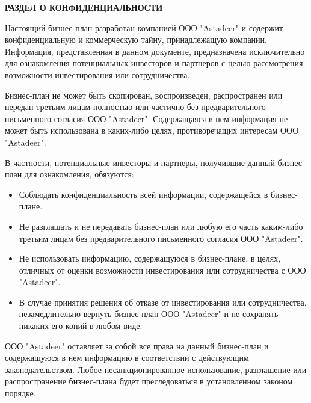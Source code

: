 \newpage %

\begin{center}
    {\Large \textbf{РАЗДЕЛ О КОНФИДЕНЦИАЛЬНОСТИ}}
\end{center}

\vspace{1cm} %

\noindent Настоящий бизнес-план разработан компанией ООО "Astadeer" и содержит конфиденциальную и коммерческую тайну, принадлежащую компании. Информация, представленная в данном документе, предназначена исключительно для ознакомления потенциальных инвесторов и партнеров с целью рассмотрения возможности инвестирования или сотрудничества.

\vspace{0.5cm} %

\noindent Бизнес-план не может быть скопирован, воспроизведен, распространен или передан третьим лицам полностью или частично без предварительного письменного согласия ООО "Astadeer". Содержащаяся в нем информация не может быть использована в каких-либо целях, противоречащих интересам ООО "Astadeer".

\vspace{0.5cm} %

\noindent В частности, потенциальные инвесторы и партнеры, получившие данный бизнес-план для ознакомления, обязуются:

\begin{itemize}
    \item Соблюдать конфиденциальность всей информации, содержащейся в бизнес-плане.
    \item Не разглашать и не передавать бизнес-план или любую его часть каким-либо третьим лицам без предварительного письменного согласия ООО "Astadeer".
    \item Не использовать информацию, содержащуюся в бизнес-плане, в целях, отличных от оценки возможности инвестирования или сотрудничества с ООО "Astadeer".
    \item В случае принятия решения об отказе от инвестирования или сотрудничества, незамедлительно вернуть бизнес-план ООО "Astadeer" и не сохранять никаких его копий в любом виде.
\end{itemize}

\vspace{0.5cm} %

\noindent ООО "Astadeer" оставляет за собой все права на данный бизнес-план и содержащуюся в нем информацию в соответствии с действующим законодательством. Любое несанкционированное использование, разглашение или распространение бизнес-плана будет преследоваться в установленном законом порядке.

